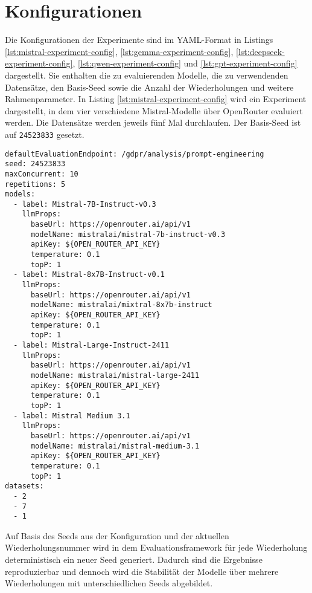 \section{Konfigurationen}\label{sec:konfigurationen}

Die Konfigurationen der Experimente sind im YAML-Format in Listings \ref{lst:mistral-experiment-config}, \ref{lst:gemma-experiment-config}, \ref{lst:deepseek-experiment-config}, \ref{lst:qwen-experiment-config} und \ref{lst:gpt-experiment-config} dargestellt. Sie enthalten die zu evaluierenden Modelle, die zu verwendenden Datensätze, den Basis-Seed sowie die Anzahl der Wiederholungen und weitere Rahmenparameter. In Listing \ref{lst:mistral-experiment-config} wird ein Experiment dargestellt, in dem vier verschiedene Mistral-Modelle über OpenRouter evaluiert werden. Die Datensätze werden jeweils fünf Mal durchlaufen. Der Basis-Seed ist auf \texttt{24523833} gesetzt.

\begin{lstlisting}[caption={Konfigurationsdatei des Experiments mit Mistral Modellen}, label={lst:mistral-experiment-config}]
defaultEvaluationEndpoint: /gdpr/analysis/prompt-engineering
seed: 24523833
maxConcurrent: 10
repetitions: 5
models:
  - label: Mistral-7B-Instruct-v0.3
    llmProps:
      baseUrl: https://openrouter.ai/api/v1
      modelName: mistralai/mistral-7b-instruct-v0.3
      apiKey: ${OPEN_ROUTER_API_KEY}
      temperature: 0.1
      topP: 1
  - label: Mistral-8x7B-Instruct-v0.1
    llmProps:
      baseUrl: https://openrouter.ai/api/v1
      modelName: mistralai/mixtral-8x7b-instruct
      apiKey: ${OPEN_ROUTER_API_KEY}
      temperature: 0.1
      topP: 1
  - label: Mistral-Large-Instruct-2411
    llmProps:
      baseUrl: https://openrouter.ai/api/v1
      modelName: mistralai/mistral-large-2411
      apiKey: ${OPEN_ROUTER_API_KEY}
      temperature: 0.1
      topP: 1
  - label: Mistral Medium 3.1
    llmProps:
      baseUrl: https://openrouter.ai/api/v1
      modelName: mistralai/mistral-medium-3.1
      apiKey: ${OPEN_ROUTER_API_KEY}
      temperature: 0.1
      topP: 1
datasets:
  - 2
  - 7
  - 1
\end{lstlisting}

Auf Basis des Seeds aus der Konfiguration und der aktuellen Wiederholungsnummer wird in dem Evaluationsframework für jede Wiederholung deterministisch ein neuer Seed generiert. Dadurch sind die Ergebnisse reproduzierbar und dennoch wird die Stabilität der Modelle über mehrere Wiederholungen mit unterschiedlichen Seeds abgebildet.

